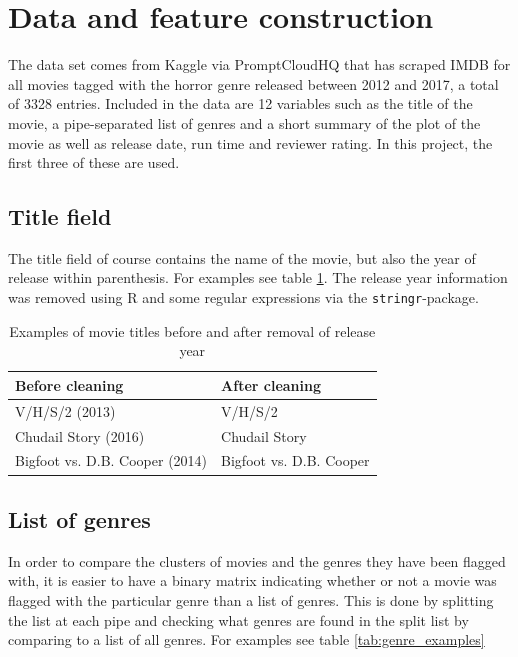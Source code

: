 \documentclass[11pt,a4paper]{article}
\begin{document}
\newpage


\section{Data and feature construction}

The data set comes from Kaggle via PromptCloudHQ that has scraped IMDB for all movies tagged with the horror genre released between 2012 and 2017, a total of 3328 entries. Included in the data are 12 variables such as the title of the movie, a pipe-separated list of genres and a short summary of the plot of the movie as well as release date, run time and reviewer rating. In this project, the first three of these are used.

\subsection{Title field}

The title field of course contains the name of the movie, but also the year of release within parenthesis. For examples see table \ref{tab:title_examples}. The release year information was removed using R and some regular expressions via the \verb|stringr|-package.


\begin{table}[ht]
\centering
\label{tab:title_examples}
\begin{tabular}{ll}
  \hline
 \textbf{Before cleaning} & \textbf{After cleaning} \\ 
  \hline
 V/H/S/2 (2013) & V/H/S/2 \\ 
 Chudail Story (2016) & Chudail Story \\ 
 Bigfoot vs. D.B. Cooper (2014) & Bigfoot vs. D.B. Cooper \\ 
   \hline
\end{tabular}
\caption{Examples of movie titles before and after removal of release year}
\end{table}

\subsection{List of genres}

In order to compare the clusters of movies and the genres they have been flagged with, it is easier to have a binary matrix indicating whether or not a movie was flagged with the particular genre than a list of genres. This is done by splitting the list at each pipe and checking what genres are found in the split list by comparing to a list of all genres. For examples see table \ref{tab:genre_examples}
\end{document}
